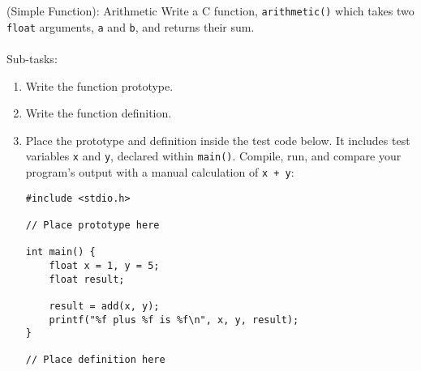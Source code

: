 \documentclass{lab}
\begin{document}
\begin{task}{(Simple Function): Arithmetic}{}
Write a C function, \texttt{arithmetic()} which takes two \texttt{float} arguments, \texttt{a} and \texttt{b}, and returns their sum.
\\~\\
Sub-tasks:
\begin{enumerate}
	\item Write the function prototype.
	\item Write the function definition.
	\item Place the prototype and definition inside the test code below. It includes test variables \texttt{x} and \texttt{y}, declared within \texttt{main()}. Compile, run, and compare your program's output with a manual calculation of \texttt{x + y}:
	\begin{lstlisting}[style=CStyle]
#include <stdio.h>
	
// Place prototype here
	
int main() {
	float x = 1, y = 5;
	float result;
	
	result = add(x, y);
	printf("%f plus %f is %f\n", x, y, result);
}

// Place definition here
	\end{lstlisting}
\end{enumerate}
\end{task}
\end{document}
